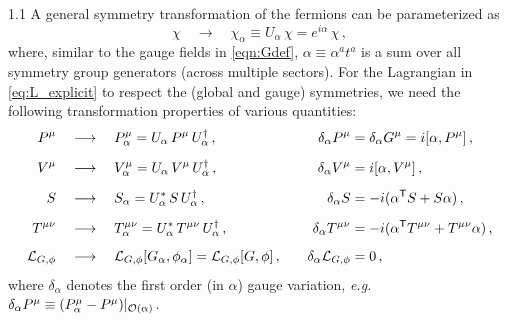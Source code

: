 \documentclass[a4paper,12pt]{article}
\def\L{{\cal L}}
\def\O{{\cal O}}
\def\eg{\emph{e.g.}}
\def\T{\textsf{T}}
\begin{document}
\begin{spacing}{1.1}
A general symmetry transformation of the fermions can be parameterized as
\begin{equation}
\chi
\quad\rightarrow\quad
\chi_\alpha \equiv U_\alpha\, \chi = e^{i\alpha}\, \chi \,,
\label{eqn:GTfermions}
\end{equation}
where, similar to the gauge fields in \cref{eqn:Gdef}, $\alpha \equiv \alpha^a t^a$ is a sum over all symmetry group generators (across multiple sectors). For the Lagrangian in \cref{eq:L_explicit} to respect the (global and gauge) symmetries, we need the following transformation properties of various quantities:
\begin{subequations}\label{eqn:GTvarious}
\begin{align}
P^\mu
&\quad\longrightarrow\quad
P^\mu_\alpha = U_\alpha\, P^\mu\, U_\alpha^\dagger \,,\quad
&\delta_\alpha P^\mu &= \delta_\alpha G^\mu = i\comm{\alpha}{P^\mu} \,, \\[5pt]
V^\mu
&\quad\longrightarrow\quad
V^\mu_\alpha = U_\alpha\, V^\mu\, U_\alpha^\dagger \,,\quad
&\delta_\alpha V^\mu &= i\comm{\alpha}{V^\mu} \,, \\[5pt]
S
&\quad\longrightarrow\quad
S_\alpha = U_\alpha^*\, S\, U_\alpha^\dagger \,,\quad
&\delta_\alpha S &= - i(\alpha^\T S + S \alpha) \,, \\[5pt]
T^{\mu\nu}
&\quad\longrightarrow\quad
T^{\mu\nu}_\alpha = U_\alpha^*\, T^{\mu\nu}\, U_\alpha^\dagger \,,\quad
&\delta_\alpha T^{\mu\nu} &= - i(\alpha^\T T^{\mu\nu} + T^{\mu\nu} \alpha) \,, \\[5pt]
\L_{G,\phi}
&\quad\longrightarrow\quad
\L_{G,\phi} [G_\alpha, \phi_\alpha] = \L_{G,\phi}[G, \phi] \,,\quad
&\delta_\alpha \L_{G,\phi} &= 0 \,,
\end{align}
\end{subequations}
where $\delta_\alpha$ denotes the first order (in $\alpha$) gauge variation, \eg\ $\delta_\alpha P^\mu \equiv (P^\mu_\alpha - P^\mu)|_{\O(\alpha)}$.


\end{spacing}
\end{document}
